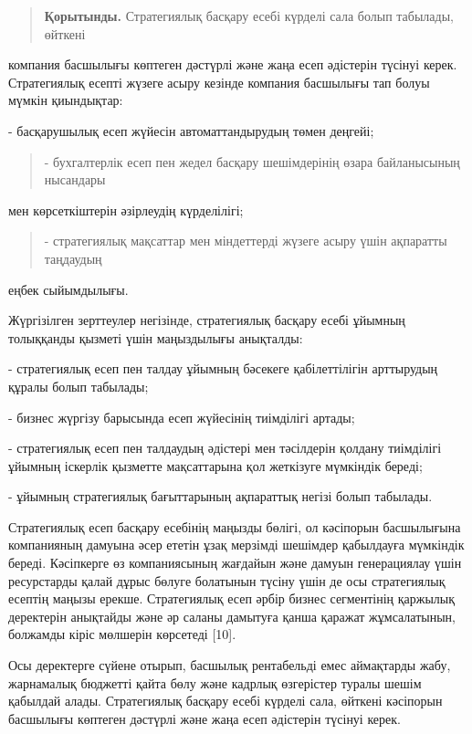 \begin{quote}
{\bfseries Қорытынды.} Стратегиялық басқару есебі күрделі сала болып
табылады, өйткені
\end{quote}

компания басшылығы көптеген дәстүрлі және жаңа есеп әдістерін түсінуі
керек. Стратегиялық есепті жүзеге асыру кезінде компания басшылығы тап
болуы мүмкін қиындықтар:

- басқарушылық есеп жүйесін автоматтандырудың төмен деңгейі;

\begin{quote}
- бухгалтерлік есеп пен жедел басқару шешімдерінің өзара байланысының
нысандары
\end{quote}

мен көрсеткіштерін әзірлеудің күрделілігі;

\begin{quote}
- стратегиялық мақсаттар мен міндеттерді жүзеге асыру үшін ақпаратты
таңдаудың
\end{quote}

еңбек сыйымдылығы.

Жүргізілген зерттеулер негізінде, стратегиялық басқару есебі ұйымның
толыққанды қызметі үшін маңыздылығы анықталды:

- стратегиялық есеп пен талдау ұйымның бәсекеге қабілеттілігін
арттырудың құралы болып табылады;

- бизнес жүргізу барысында есеп жүйесінің тиімділігі артады;

- стратегиялық есеп пен талдаудың әдістері мен тәсілдерін қолдану
тиімділігі ұйымның іскерлік қызметте мақсаттарына қол жеткізуге
мүмкіндік береді;

- ұйымның стратегиялық бағыттарының ақпараттық негізі болып табылады.

Стратегиялық есеп басқару есебінің маңызды бөлігі, ол кәсіпорын
басшылығына компанияның дамуына әсер ететін ұзақ мерзімді шешімдер
қабылдауға мүмкіндік береді. Кәсіпкерге өз компаниясының жағдайын және
дамуын генерациялау үшін ресурстарды қалай дұрыс бөлуге болатынын түсіну
үшін де осы стратегиялық есептің маңызы ерекше. Стратегиялық есеп әрбір
бизнес сегментінің қаржылық деректерін анықтайды және әр саланы дамытуға
қанша қаражат жұмсалатынын, болжамды кіріс мөлшерін көрсетеді {[}10{]}.

Осы деректерге сүйене отырып, басшылық рентабельді емес аймақтарды жабу,
жарнамалық бюджетті қайта бөлу және кадрлық өзгерістер туралы шешім
қабылдай алады. Стратегиялық басқару есебі күрделі сала, өйткені
кәсіпорын басшылығы көптеген дәстүрлі және жаңа есеп әдістерін түсінуі
керек.

